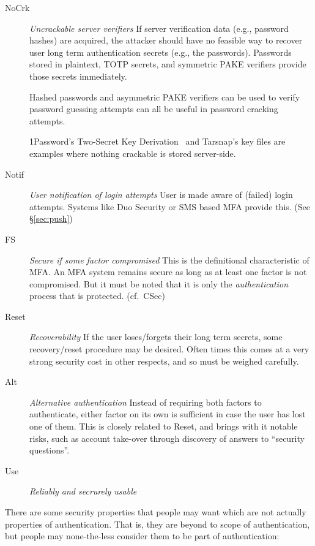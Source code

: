 \documentclass{soups}
\newcommand{\propdescription}[1]{\textit{#1}\newline}
\begin{document}
\begin{description}
  \item[NoCrk] \propdescription{Uncrackable server verifiers}
   If server verification data (e.g., password hashes) are acquired,
   the attacker should have no feasible way to recover user long term authentication secrets (e.g., the passwords).
   Passwords stored in plaintext, TOTP secrets, and symmetric PAKE verifiers
   provide those secrets immediately.
   
   Hashed passwords and asymmetric PAKE verifiers can be used
   to verify password guessing attempts
   can all be useful in password cracking attempts.

   1Password's Two-Secret Key Derivation~\autocite{1Password:whitepaper}
   and Tarsnap's key files \autocite{mwlucas:tarsnap}
   are examples where nothing crackable is stored server-side.

  \item[Notif] \propdescription{User notification of login attempts}
    User is made aware of (failed) login attempts.
    Systems like Duo Security or SMS based MFA provide this.
    (See \S\ref{sec:push})

  \item[FS] \propdescription{Secure if some factor compromised}
    This is the definitional characteristic of MFA.
    An MFA system remains secure as long as at least one factor is not compromised.
    But it must be noted that it is only the \emph{authentication} process that is protected.
    (cf.~CSec)

  \item[Reset] \propdescription{Recoverability}
   If the user loses/forgets their long term secrets, some recovery/reset procedure may be desired. Often times this comes at a very strong security cost in other respects, and so must be weighed carefully.

  \item[Alt] \propdescription{Alternative authentication}
  Instead of requiring both factors to authenticate, either factor on its own is sufficient in case the user has lost one of them. This is closely related to Reset, and brings with it notable risks, such as account take-over through discovery of answers to “security questions”.

  \item[Use] \propdescription{Reliably and secrurely usable}
   
\end{description}

There are some security properties that people may want which are not actually properties of authentication. That is, they are beyond to scope of authentication, but people may none-the-less consider them to be part of authentication:
\end{document}
